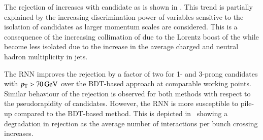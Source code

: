 The \faketauhadvis rejection of \tauid increases with \tauhadvis
candidate \pT as is shown in
. This trend is
partially explained by the increasing discrimination power of
variables sensitive to the isolation of \tauhadvis candidates as
larger momentum scales are considered. This is a consequence of the
increasing collimation of \truetauhadvis due to the Lorentz boost of
the \taulepton while \faketauhadvis become less isolated due to the
increase in the average charged and neutral hadron multiplicity in
jets.


The RNN \tauid improves the \faketauhadvis rejection by a factor of
two for 1- and 3-prong \tauhadvis candidates with
$\pT > \SI{70}{\GeV}$ over the BDT-based approach at comparable
working points. Similar behaviour of the \faketauhadvis rejection is
observed for both methods with respect to the pseudorapidity of
\tauhadvis candidates. However, the RNN \tauid is more susceptible to
pile-up compared to the BDT-based method. This is depicted
in~ showing a
degradation in \faketauhadvis rejection as the average number of
interactions per bunch crossing increases.

